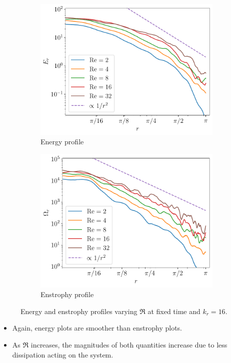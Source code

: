 \documentclass{beamer} %
\begin{document}
\begin{frame}
	\begin{figure}[!ht]
		\begin{subfigure}{0.44\textwidth}
			\centering
			\includegraphics[width=\textwidth]{../images/Energy_Re.kdn16.175.pdf}
			\caption{Energy profile}
		\end{subfigure}\hspace{0.04\textwidth}
		\begin{subfigure}{0.44\textwidth}
			\centering
			\includegraphics[width=\textwidth]{../images/Enstrophy_Re.kdn16.175.pdf}
			\caption{Enstrophy profile}
		\end{subfigure}
		\caption{Energy and enstrophy profiles varying $\Re$ at fixed time and $k_r=16$.}
	\end{figure}
	\begin{itemize}
		\item Again, energy plots are smoother than enstrophy plots.
		\item As $\Re$ increases, the magnitudes of both quantities increase due to less dissipation acting on the system.
	\end{itemize}
\end{frame}
\end{document}
